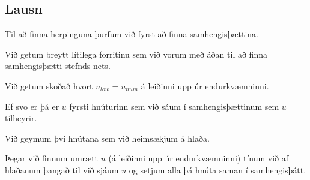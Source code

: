 \subsection{Lausn}
{
    {
        \item<1-> Til að finna herpinguna þurfum við fyrst að finna samhengisþættina.
        \item<2-> Við getum breytt lítilega forritinu sem við vorum með áðan til að finna samhengisþætti stefnds nets.
        \item<3-> Við getum skoðað hvort $u_{low} = u_{num}$ á leiðinni upp úr endurkvæmninni.
        \item<4-> Ef svo er þá er $u$ fyrsti hnúturinn sem við sáum í samhengisþættinum sem $u$ tilheyrir.
        \item<5-> Við geymum því hnútana sem við heimsækjum á hlaða.
        \item<6-> Þegar við finnum umrætt $u$ (á leiðinni upp úr endurkvæmninni) tínum við af hlaðanum
                    þangað til við sjáum $u$ og setjum alla þá hnúta saman í samhengisþátt.
    }
}

